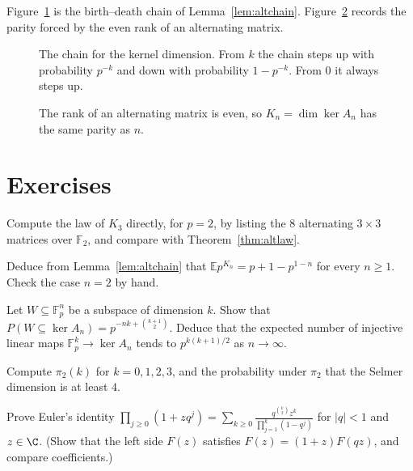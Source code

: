 Figure~\ref{fig:v15c08-chain} is the birth--death chain of Lemma~\ref{lem:altchain}. Figure~\ref{fig:v15c08-parity} records the parity forced by the even rank of an alternating matrix.

\begin{figure}[ht]
\centering
{}
\caption{The chain for the kernel dimension. From \(k\) the chain steps up with probability \(p^{-k}\) and down with probability \(1-p^{-k}\). From \(0\) it always steps up.}
\label{fig:v15c08-chain}
\end{figure}

\begin{figure}[ht]
\centering
{}
\caption{The rank of an alternating matrix is even, so \(K_n=\dim\ker A_n\) has the same parity as \(n\).}
\label{fig:v15c08-parity}
\end{figure}

\section{Exercises}

\begin{exercise}[$\star$]\label{ex:alt3}
Compute the law of $K_3$ directly, for $p=2$, by listing the $8$ alternating $3\times3$ matrices over $\mathbb F_2$, and compare with Theorem~\ref{thm:altlaw}.
\end{exercise}

\begin{exercise}[$\star$]\label{ex:altmean}
Deduce from Lemma~\ref{lem:altchain} that $\mathbb Ep^{K_n}=p+1-p^{1-n}$ for every $n\ge1$. Check the case $n=2$ by hand.
\end{exercise}

\begin{exercise}[$\star\star$]\label{ex:altsubspaces}
Let $W\subseteq\mathbb F_p^n$ be a subspace of dimension $k$. Show that $P(W\subseteq\ker A_n)=p^{-nk+\binom{k+1}2}$. Deduce that the expected number of injective linear maps $\mathbb F_p^k\to\ker A_n$ tends to $p^{k(k+1)/2}$ as $n\to\infty$.
\end{exercise}

\begin{exercise}[$\star$]\label{ex:prnumbers}
Compute $\pi_2(k)$ for $k=0,1,2,3$, and the probability under $\pi_2$ that the Selmer dimension is at least $4$.
\end{exercise}

\begin{exercise}[$\star\star$]\label{ex:euler}
Prove Euler's identity $\prod_{j\ge0}(1+zq^j)=\sum_{k\ge0}\frac{q^{\binom k2}z^k}{\prod_{j=1}^k(1-q^j)}$ for $|q|<1$ and $z\in\C$. (Show that the left side $F(z)$ satisfies $F(z)=(1+z)F(qz)$, and compare coefficients.)
\end{exercise}


